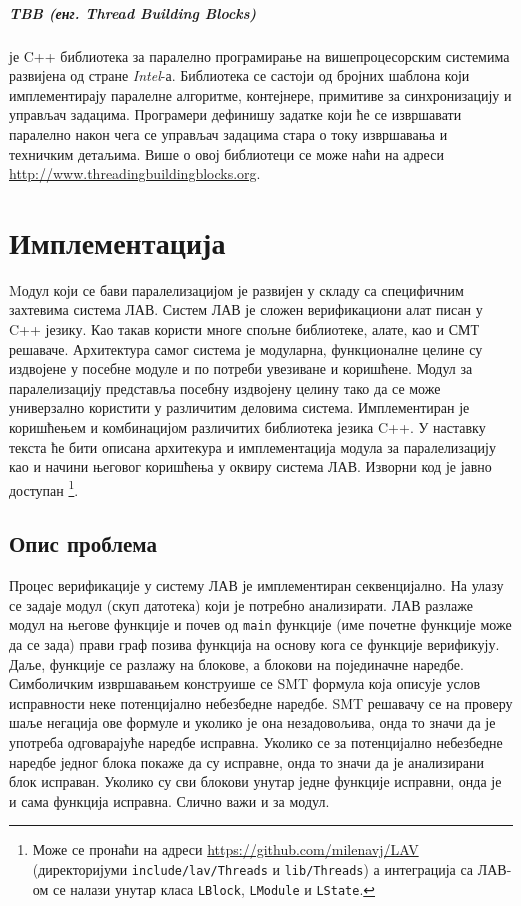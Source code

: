 \documentclass[12pt,oneside]{memoir}
\begin{document}
\paragraph{TBB (енг. Thread Building Blocks)} је C++ библиотека за паралелно програмирање на вишепроцесорским системима развијена од стране \emph{Intel}-а. Библиотека се састоји од бројних шаблона који имплементирају паралелне алгоритме, контејнере, примитиве за синхронизацију и управљач задацима. Програмери дефинишу задатке који ће се извршавати паралелно након чега се управљач задацима стара о току извршавања и техничким детаљима. Више о овој библиотеци се може наћи на адреси \url{http://www.threadingbuildingblocks.org}.


  
\chapter{Имплементација}

Mодул који се бави паралелизацијом је развијен у складу са специфичним захтевима система ЛАВ. Систем ЛАВ је сложен верификациони алат писан у C++ језику. Као такав користи многе спољне библиотеке, алате, као и СМТ решаваче.  Архитектура самог система је модуларна, функционалне целине су издвојене у посебне модуле и по потреби увезиване и коришћене. Модул за паралелизацију представља посебну издвојену целину тако да се може универзално користити у различитим деловима система. Имплементиран је коришћењем  и комбинацијом различитих библиотека језика C++.   У наставку текста ће бити описана архитекура и имплементација модула за паралелизацију као и начини његовог коришћења у оквиру система ЛАВ. Изворни код је јавно доступан \footnote{Може се пронаћи на адреси \url{https://github.com/milenavj/LAV} (директоријуми \texttt{include/lav/Threads} и \texttt{lib/Threads}) а интеграција са ЛАВ-ом се налази унутар класа \texttt{LBlock}, \texttt{LModule} и \texttt{LState}.}.  

\section{Опис проблема}
Процес верификације у систему ЛАВ је имплементиран секвенцијално. На улазу се задаје модул (скуп датотека) који је потребно анализирати.  ЛАВ разлаже модул на његове функције и почев од \texttt{main} функције (име почетне функције може да се зада) прави граф позива функција  на основу кога се функције верификују. Даље, функције се разлажу на блокове, а блокови на појединачне наредбе. Симболичким извршавањем конструише се SMT формула која описује услов исправности неке потенцијално небезбедне наредбе. SMT решавачу се на проверу шаље негација ове формуле и уколико је она незадовољива, онда то значи да је употреба одговарајуће наредбе исправна. Уколико се за потенцијално небезбедне наредбе једног блока покаже да су исправне, онда то значи да је анализирани блок исправан. Уколико су сви блокови унутар једне функције исправни, онда је и сама функција исправна. Слично важи и за модул. 
\end{document}
